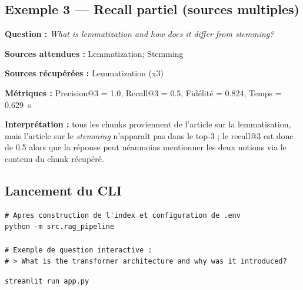 \subsection{Exemple 3 --- Recall partiel (sources multiples)}

\textbf{Question :} \emph{What is lemmatization and how does it differ from stemming?}

\textbf{Sources attendues :} Lemmatization; Stemming

\textbf{Sources r\'ecup\'er\'ees :} Lemmatization (x3)

\textbf{M\'etriques :} Precision@3 = 1.0, Recall@3 = 0.5, Fid\'elit\'e = 0.824, Temps = 0.629~s

\textbf{Interpr\'etation :} tous les chunks proviennent de l'article sur la lemmatisation, mais
l'article sur le \emph{stemming} n'appara\^it pas dans le top-3 ; le recall@3 est donc de 0.5
alors que la r\'eponse peut n\'eanmoins mentionner les deux notions via le contenu du chunk
r\'ecup\'er\'e.

\subsection{Lancement du CLI}

\begin{lstlisting}[style=python,caption={Commande pour interroger le systeme en ligne de commande.}]
# Apres construction de l'index et configuration de .env
python -m src.rag_pipeline

# Exemple de question interactive :
# > What is the transformer architecture and why was it introduced?
\end{lstlisting}

\begin{lstlisting}[style=python,caption={Lancement de l'interface Streamlit.}]
streamlit run app.py
\end{lstlisting}
